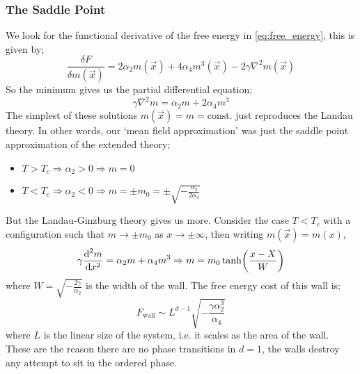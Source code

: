 \subsubsection{The Saddle Point}
We look for the functional derivative of the free energy in \eqref{eq:free_energy}, this is given by;
\begin{equation}
\frac{\delta F}{\delta m(\vec x)} = 2\alpha_2 m(\vec x) + 4\alpha_4 m^3(\vec x) - 2\gamma \nabla^2 m(\vec x)
\end{equation}
So the minimum gives us the partial differential equation;
\begin{equation}
\gamma \nabla^2 m = \alpha_2 m + 2\alpha_4 m^3
\end{equation}
The simplest of these solutions $m(\vec x) = m = \textrm{const.}$ just reproduces the Landau theory. In other words, our `mean field approximation' was just the saddle point approximation of the extended theory;
\begin{itemize}
\item $T > T_c \Rightarrow \alpha_2 > 0 \Rightarrow m = 0$
\item $T < T_c \Rightarrow \alpha_2 < 0 \Rightarrow m = \pm m_0 = \pm \sqrt{-\tfrac{\alpha_2}{2\alpha_4}}$
\end{itemize}
But the Landau-Ginzburg theory gives us more. Consider the case $T < T_c$ with a configuration such that $m \rightarrow \pm m_0$ as $x \rightarrow \pm \infty$, then writing $m(\vec x) = m(x)$, 
\begin{equation}
\label{eq:wallprofile}
\gamma \frac{\ud^2 m}{\ud x^2} = \alpha_2 m + \alpha_4 m^3 \Rightarrow m = m_0 \tanh \left(\frac{x - X}{W}\right)
\end{equation}
where $W = \sqrt{-\tfrac{2\gamma}{\alpha_2}}$ is the width of the wall. The free energy cost of this wall is;
\begin{equation}
\label{eq:wallenergy}
F_{\textrm{wall}} \sim L^{d - 1} \sqrt{-\frac{\gamma \alpha_2^3}{\alpha_4}}
\end{equation}
where $L$ is the linear size of the system, i.e. it scales as the area of the wall. These are the reason there are no phase transitions in $d = 1$, the walls destroy any attempt to sit in the ordered phase. 
